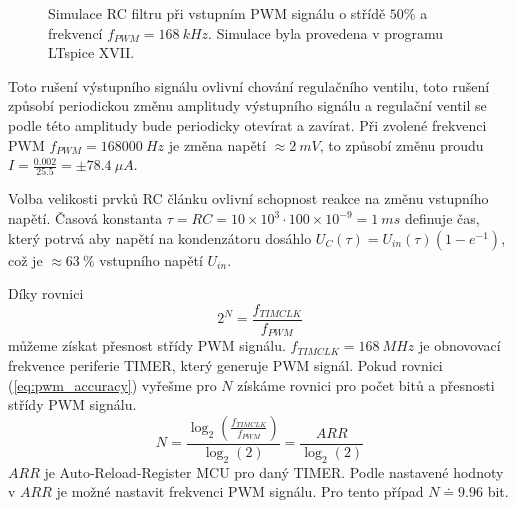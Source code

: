 \begin{figure}[H]
    \caption{Simulace RC filtru při vstupním PWM signálu o střídě $50\%$ a frekvencí $f_{PWM} = 168 \ kHz $. Simulace byla provedena v programu LTspice XVII.}
    \label{fig:filtered_pwm}
\end{figure}

Toto rušení výstupního signálu ovlivní chování regulačního ventilu, toto rušení způsobí periodickou změnu amplitudy výstupního signálu a regulační ventil se podle této amplitudy bude periodicky otevírat a zavírat. Při zvolené frekvenci PWM $f_{PWM} = 168000 \ Hz $ je změna napětí $\approx 2 \ mV$, to způsobí změnu proudu $I = \frac{0.002}{25.5} = \pm 78.4 \ \mu A $. \par
Volba velikosti prvků RC článku ovlivní schopnost reakce na změnu vstupního napětí.
Časová konstanta $\tau = RC = 10 \times 10^{3} \cdot 100 \times 10^{-9}= 1\ ms$ definuje čas, který potrvá aby napětí na kondenzátoru dosáhlo $U_{C}(\tau) = U_{in}(\tau)(1 - e^{-1})$, což je $\approx 63 \ \% $ vstupního napětí $U_{in}$.

\par
Díky rovnici
\begin{equation} \label{eq:pwm_accuracy}
    2^N = \frac{f_{TIMCLK}}{f_{PWM}}
\end{equation}
můžeme získat přesnost střídy PWM signálu. $f_{TIMCLK} = 168 \ MHz$ je obnovovací frekvence periferie TIMER, který generuje PWM signál. Pokud rovnici (\ref{eq:pwm_accuracy}) vyřešme pro $N$ získáme rovnici pro počet bitů a přesnosti střídy PWM signálu.
\begin{equation}
    N = \frac{\log_{2} (\frac{f_{TIMCLK}}{f_{PWM}})}{\log_{2}(2)} = \frac{ARR}{\log_{2}(2)}
\end{equation}
$ARR$ je Auto-Reload-Register MCU pro daný TIMER. Podle nastavené hodnoty v $ARR$ je možné nastavit frekvenci PWM signálu. Pro tento případ $N \doteq 9.96 $ bit.

